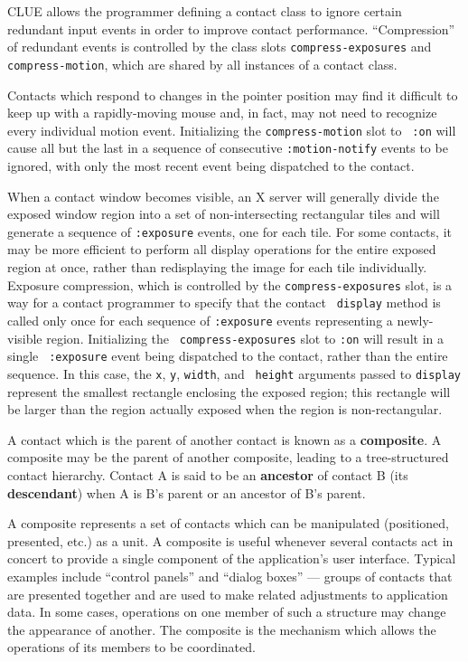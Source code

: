 CLUE allows the programmer defining a contact class to ignore certain redundant
input events in order to improve contact performance. ``Compression'' of
redundant events is controlled by the class slots {\tt compress-exposures} and
{\tt compress-motion}, which are shared by all instances of a contact class.

Contacts which respond to changes in the pointer position may find it difficult
to keep up with a rapidly-moving mouse and, in fact, may not need to recognize every
individual motion event. Initializing the {\tt compress-motion} slot to {\tt
:on} will cause all but the last in a sequence of consecutive {\tt :motion-notify}
events to be
ignored, with only the most recent event being dispatched to the contact.

When a contact window becomes visible, an X server will generally divide
the exposed window region into a set of non-intersecting rectangular
tiles and will generate a sequence of {\tt :exposure} events, one for
each tile.  For some contacts, it may be more efficient to perform all
display operations for the entire exposed region at once, rather than
redisplaying the image for each tile individually.  Exposure
compression, which is controlled by the {\tt compress-exposures} slot,
is a way for a contact programmer to specify that the contact {\tt
display} method is called only once for each sequence of {\tt :exposure}
events representing a newly-visible region.  Initializing the {\tt
compress-exposures} slot to {\tt :on} will result in a single {\tt
:exposure} event being dispatched to the contact, rather than the entire
sequence.  In this case, the {\tt x}, {\tt y}, {\tt width}, and {\tt
height} arguments passed to {\tt display} 
represent the smallest rectangle enclosing the exposed region; this
rectangle will be larger than the region actually exposed when the
region is non-rectangular.



A contact which is the parent of another contact is known as a
{\bf composite}. A composite 
may be the parent of another composite, leading to a
tree-structured contact hierarchy. Contact A is said to be an
{\bf ancestor} of contact B (its 
{\bf descendant}) when
A is B's parent or an ancestor of B's parent. 

A composite represents a set of contacts which can be manipulated
(positioned, presented,
etc.) as a unit.  A composite is useful whenever several contacts act in concert to provide a
single component of the application's user interface.  Typical examples include
``control panels'' and ``dialog boxes'' --- groups of contacts that are presented
together and are used to make related adjustments to application data.  In some
cases, operations on one member of such a structure may change the appearance of
another.  The composite is the mechanism which allows the operations of its
members to be coordinated.

